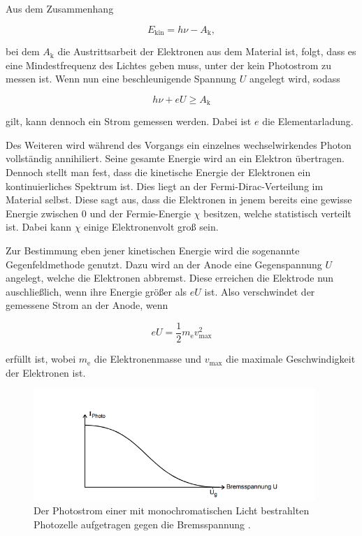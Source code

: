 Aus dem Zusammenhang

\begin{equation}
    \label{eqn:elek-energie}
    E_\text{kin} = h \nu - A_\text{k},
\end{equation}

bei dem $A_\text{k}$ die Austrittsarbeit der Elektronen aus dem Material ist,
folgt, dass es eine Mindestfrequenz des Lichtes geben muss, unter der kein Photostrom zu messen ist.
Wenn nun eine beschleunigende Spannung $U$ angelegt wird, sodass

\begin{equation}
    \label{eqn:besch}
    h \nu + e U \geq A_\text{k}
\end{equation}

gilt, kann dennoch ein Strom gemessen werden. Dabei ist $e$ die Elementarladung.

Des Weiteren wird während des Vorgangs ein einzelnes wechselwirkendes Photon vollständig annihiliert.
Seine gesamte Energie wird an ein Elektron übertragen.
Dennoch stellt man fest, dass die kinetische Energie der Elektronen ein kontinuierliches Spektrum ist.
Dies liegt an der Fermi-Dirac-Verteilung im Material selbst. Diese sagt aus,
dass die Elektronen in jenem bereits eine gewisse Energie zwischen $0$ und der Fermie-Energie $\chi$ besitzen,
welche statistisch verteilt ist. Dabei kann $\chi$ einige Elektronenvolt groß sein.

Zur Bestimmung eben jener kinetischen Energie wird die sogenannte Gegenfeldmethode genutzt.
Dazu wird an der Anode eine Gegenspannung $U$ angelegt, welche die Elektronen abbremst.
Diese erreichen die Elektrode nun auschließlich, wenn ihre Energie größer als $e U$ ist.
Also verschwindet der gemessene Strom an der Anode, wenn

\begin{equation}
    \label{eqn:gegenfeld}
    e U = \frac{1}{2} m_\text{e} v_\text{max}^2
\end{equation}

erfüllt ist, wobei $m_\text{e}$ die Elektronenmasse und $v_\text{max}$ die maximale Geschwindigkeit der Elektronen ist.

\begin{figure}
  \centering
  \includegraphics[width=0.95\textwidth]{content/brems-photo.png}
  \caption{Der Photostrom einer mit monochromatischen Licht bestrahlten Photozelle aufgetragen gegen die Bremsspannung \cite{V500}.}
  \label{fig:brems-photo}
\end{figure}

